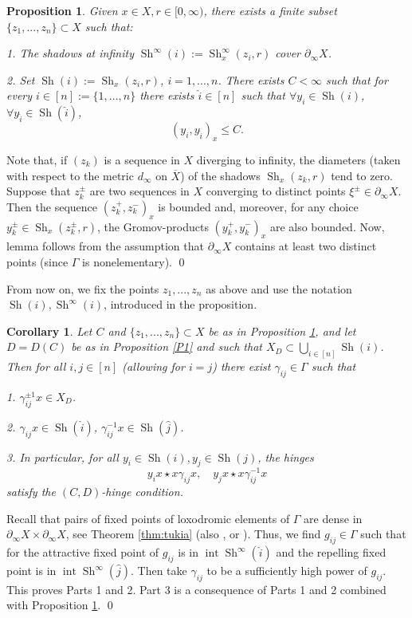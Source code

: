 \documentclass[12pt]{amsbook}%
\newtheorem{prop}[thm]{Proposition}
\newtheorem{cor}[thm]{Corollary}
\theoremstyle{definition}
\theoremstyle{remark}
\numberwithin{section}{chapter}
\numberwithin{subsection}{section}
\numberwithin{figure}{chapter}
\DeclareMathOperator{\Sh}{Sh}
\def\Ga{\Gamma}
\def\ga{\gamma}
\def\geo{\partial_\infty}
\def\ol{\overline}
\def\inte{\operatorname{int}}
\def\kap{}
\begin{document}
{{\begin{prop}\label{P2} 
Given $x\in X, r\in [0,\infty)$, there exists a finite subset $\{z_1,...,z_n\}\subset X$ such that:

1. The shadows at infinity $\Sh^\infty(i):= \Sh^\infty_x(z_i,r)$ cover $\geo X$.  

2. Set $\Sh(i):= \Sh_x(z_i,r)$,  $i=1,...,n$.  
There exists $C<\infty$ such that for every $i\in [n]:=\{1,...,n\}$ there exists  
$\hat{i}\in [n]$ such that $\forall y_i\in \Sh(i)$, $\forall y_{\hat{i}}\in \Sh(\hat i)$,   %
$$
(y_i, y_{\hat{i}})_x\leqslant C. %
$$
\end{prop}
\proof Note that, if $(z_k)$ is a sequence in $X$ diverging to infinity, the diameters (taken with respect to the metric $d_\infty$ on $\ol{X}$) of the shadows $\Sh_x(z_k,r)$ tend to zero. Suppose that $z_k^\pm$ are two sequences in $X$ converging to distinct points $\xi^\pm \in \geo X$. Then the sequence 
$(z_k^+, z_k^-)_x$ is bounded and, moreover, for any choice $y_k^\pm \in \Sh_x(z_k^\pm, r)$, the Gromov-products   
$(y_k^+, y_k^-)_x$ are also bounded. Now, lemma follows from the assumption that $\geo X$ contains at least two distinct points (since $\Ga$ is nonelementary). \qed 

\medskip
From now on, we fix the points $z_1,...,z_n$ as above and use the notation $\Sh(i), \Sh^\infty(i)$, introduced in the proposition. 


\begin{cor}\label{cor:P2}
Let $C$ and $\{z_1,...,z_n\}\subset X$ be as in Proposition \ref{P2},  and let $D=D(C)$ be as in Proposition \ref{P1} 
and such that $X_D\subset \bigcup_{i\in [n]} \Sh(i)$. Then for all $i, j\in [n]$ (allowing for $i=j$) there exist 
$\gamma_{ij}\in \Gamma$  such that

1. $\gamma^{\pm 1}_{ij} x\in X_D$. 

2. $\gamma_{ij} x\in \Sh(\hat i)$, $\gamma^{-1}_{ij} x\in \Sh(\hat j)$. 

3. In particular, for all $y_i\in \Sh(i), y_j\in \Sh(j)$, the hinges  
$$
y_i x \star x\gamma_{ij}x, \quad y_j x \star x\gamma^{-1}_{ij}x
$$
satisfy the $(C,D)$-hinge condition. 
\end{cor}
\proof Recall that pairs of fixed points of loxodromic elements of $\Gamma$ are dense in  
$\geo X \times \geo X$, see Theorem \ref{thm:tukia} (also \cite[Corollary 8.2.G]{Gromov}, \cite[Theorem 2R]{Tukia} or \cite[Proposition 7.4.7]{DSU}). Thus, 
we find $g_{ij}\in \Ga$ such that for the attractive fixed point of $g_{ij}$ is in $\inte \Sh^\infty(\hat i)$ and the repelling fixed point is in $\inte \Sh^\infty(\hat j)$. 
Then take $\ga_{ij}$ to be a sufficiently high power of $g_{ij}$. This proves Parts 1 and 2. Part 3 is a consequence of Parts 1 and 2 combined with  Proposition \ref{P2}.  \qed 


}}
\end{document}
